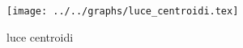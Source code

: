 \begin{figure}[h] \centering \texttt{[image: ../../graphs/luce\_centroidi.tex]}\caption{luce centroidi}\label{gr:luce_centroidi} \end{figure}
